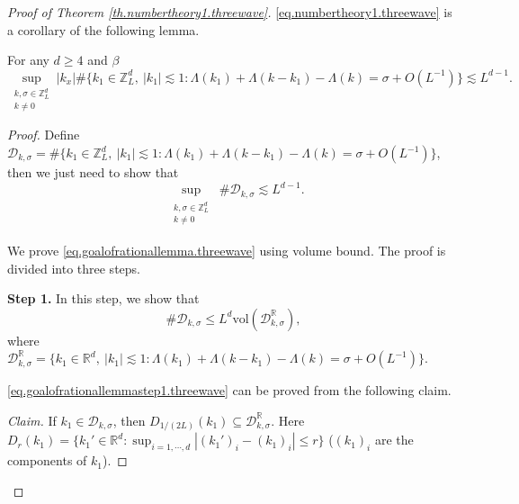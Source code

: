\begin{proof}[Proof of Theorem \ref{th.numbertheory1.threewave}]\eqref{eq.numbertheory1.threewave} is a corollary of the following lemma. 

\begin{lem}\label{lem.rationallemma.threewave} For any $d\ge 4$ and $\beta$
\begin{equation}
    \sup_{\substack{k,\sigma\in\mathbb{Z}_L^d\\k\ne 0}} |k_x| \#\{k_1\in\mathbb{Z}^d_L,\ |k_1|\lesssim 1:\Lambda(k_1)+\Lambda(k-k_1)-\Lambda(k)=\sigma+O(L^{-1})\}\lesssim L^{d-1} .
\end{equation}
\end{lem}
\begin{proof}
Define $\mathcal{D}_{k,\sigma}=\#\{k_1\in\mathbb{Z}^d_L,\ |k_1|\lesssim 1:\Lambda(k_1)+\Lambda(k-k_1)-\Lambda(k)=\sigma+O(L^{-1})\}$, then we just need to show that 
\begin{equation}\label{eq.goalofrationallemma.threewave}
    \sup_{\substack{\substack{k,\sigma\in\mathbb{Z}_L^d\\k\ne 0}}} \#\mathcal{D}_{k,\sigma}\lesssim L^{d-1} .
\end{equation}

We prove \eqref{eq.goalofrationallemma.threewave} using volume bound. The proof is divided into three steps.





\textbf{Step 1.} In this step, we show that 
\begin{equation}\label{eq.goalofrationallemmastep1.threewave}
    \#\mathcal{D}_{k,\sigma}\le L^{d} \text{vol}(\mathcal{D}^{\mathbb{R}}_{k,\sigma}),
\end{equation}
where $\mathcal{D}^{\mathbb{R}}_{k,\sigma}=\{k_1\in \mathbb{R}^d,\ |k_1|\lesssim 1:\Lambda(k_1)+\Lambda(k-k_1)-\Lambda(k)=\sigma+O(L^{-1})\}$.

\eqref{eq.goalofrationallemmastep1.threewave} can be proved from the following claim.

\textit{Claim.} If $k_1\in \mathcal{D}_{k,\sigma}$, then $D_{1/(2L)}(k_1)\subseteq \mathcal{D}^{\mathbb{R}}_{k,\sigma}$. Here  $D_{r}(k_1)=\{k_1'\in \mathbb{R}^d: \sup_{i=1,\cdots, d} |(k_1')_i-(k_1)_i|\le r\}$ ($(k_1)_i$ are the components of $k_1$). 


\end{proof}
\end{proof}
